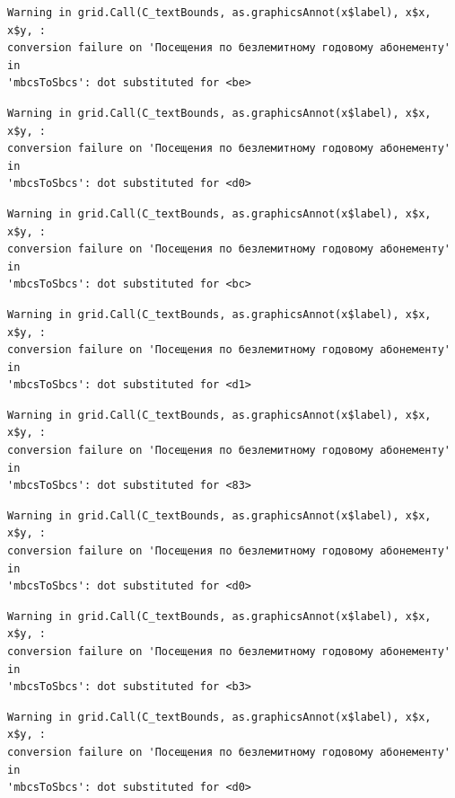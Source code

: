\documentclass[
  letterpaper,
  DIV=11,
  numbers=noendperiod]{scrartcl}
\begin{document}
\begin{verbatim}
Warning in grid.Call(C_textBounds, as.graphicsAnnot(x$label), x$x, x$y, :
conversion failure on 'Посещения по безлемитному годовому абонементу' in
'mbcsToSbcs': dot substituted for <be>
\end{verbatim}

\begin{verbatim}
Warning in grid.Call(C_textBounds, as.graphicsAnnot(x$label), x$x, x$y, :
conversion failure on 'Посещения по безлемитному годовому абонементу' in
'mbcsToSbcs': dot substituted for <d0>
\end{verbatim}

\begin{verbatim}
Warning in grid.Call(C_textBounds, as.graphicsAnnot(x$label), x$x, x$y, :
conversion failure on 'Посещения по безлемитному годовому абонементу' in
'mbcsToSbcs': dot substituted for <bc>
\end{verbatim}

\begin{verbatim}
Warning in grid.Call(C_textBounds, as.graphicsAnnot(x$label), x$x, x$y, :
conversion failure on 'Посещения по безлемитному годовому абонементу' in
'mbcsToSbcs': dot substituted for <d1>
\end{verbatim}

\begin{verbatim}
Warning in grid.Call(C_textBounds, as.graphicsAnnot(x$label), x$x, x$y, :
conversion failure on 'Посещения по безлемитному годовому абонементу' in
'mbcsToSbcs': dot substituted for <83>
\end{verbatim}

\begin{verbatim}
Warning in grid.Call(C_textBounds, as.graphicsAnnot(x$label), x$x, x$y, :
conversion failure on 'Посещения по безлемитному годовому абонементу' in
'mbcsToSbcs': dot substituted for <d0>
\end{verbatim}

\begin{verbatim}
Warning in grid.Call(C_textBounds, as.graphicsAnnot(x$label), x$x, x$y, :
conversion failure on 'Посещения по безлемитному годовому абонементу' in
'mbcsToSbcs': dot substituted for <b3>
\end{verbatim}

\begin{verbatim}
Warning in grid.Call(C_textBounds, as.graphicsAnnot(x$label), x$x, x$y, :
conversion failure on 'Посещения по безлемитному годовому абонементу' in
'mbcsToSbcs': dot substituted for <d0>
\end{verbatim}
\end{document}
